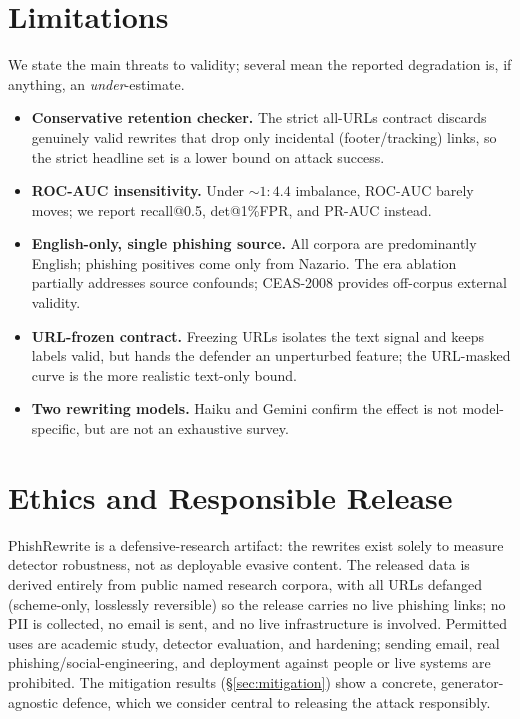 \documentclass[11pt]{article}
\begin{document}
\section{Limitations}\label{sec:limitations}
We state the main threats to validity; several mean the reported degradation is, if
anything, an \emph{under}-estimate.
\begin{itemize}
  \item \textbf{Conservative retention checker.} The strict all-URLs contract
  discards genuinely valid rewrites that drop only incidental (footer/tracking)
  links, so the strict headline set is a lower bound on attack success.
  \item \textbf{ROC-AUC insensitivity.} Under $\sim1\!:\!4.4$ imbalance, ROC-AUC
  barely moves; we report recall@0.5, det@1\%FPR, and PR-AUC instead.
  \item \textbf{English-only, single phishing source.} All corpora are
  predominantly English; phishing positives come only from Nazario. The era
  ablation partially addresses source confounds; CEAS-2008 provides off-corpus
  external validity.
  \item \textbf{URL-frozen contract.} Freezing URLs isolates the text signal and
  keeps labels valid, but hands the defender an unperturbed feature; the URL-masked
  curve is the more realistic text-only bound.
  \item \textbf{Two rewriting models.} Haiku and Gemini confirm the effect is not
  model-specific, but are not an exhaustive survey.
\end{itemize}

\section{Ethics and Responsible Release}\label{sec:ethics}
PhishRewrite is a defensive-research artifact: the rewrites exist solely to measure
detector robustness, not as deployable evasive content. The released data is
derived entirely from public named research corpora, with all URLs defanged
(scheme-only, losslessly reversible) so the release carries no live phishing links;
no PII is collected, no email is sent, and no live infrastructure is involved.
Permitted uses are academic study, detector evaluation, and hardening; sending
email, real phishing/social-engineering, and deployment against people or live
systems are prohibited. The mitigation results (\S\ref{sec:mitigation}) show a
concrete, generator-agnostic defence, which we consider central to releasing the
attack responsibly.
\end{document}

